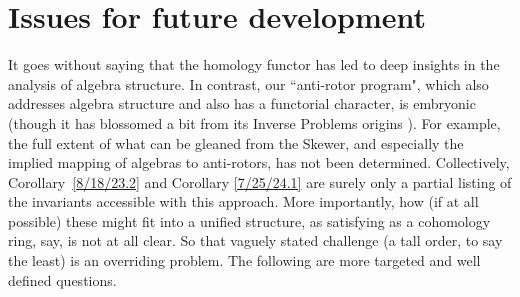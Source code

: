 \documentclass{amsart}
\numberwithin{equation}{section}
\theoremstyle{definition}
\numberwithin{theorem}{section}
\begin{document}
\vspace{1cm}

\section{Issues for future development} 
It goes without saying that the homology functor has led to deep insights in the analysis of algebra structure.  In contrast, our ``anti-rotor program", which also addresses algebra structure and also has a functorial character, is embryonic  (though it has blossomed a bit from its Inverse Problems origins \cite{fgreensite:2022d}).  For example, the full extent of what can be gleaned from the Skewer, and especially the implied mapping of algebras to anti-rotors, has not been determined.  Collectively, \mbox{Corollary \ref{8/18/23.2}} and Corollary \ref{7/25/24.1} are surely only a partial listing of the invariants accessible with this approach.  More importantly, how (if at all possible) these might fit into a unified structure, as satisfying as a cohomology ring, say, is not at all clear.  So that vaguely stated challenge (a tall order, to say the least) is an overriding problem.  The following are more targeted and well defined questions.
 
\end{document}
